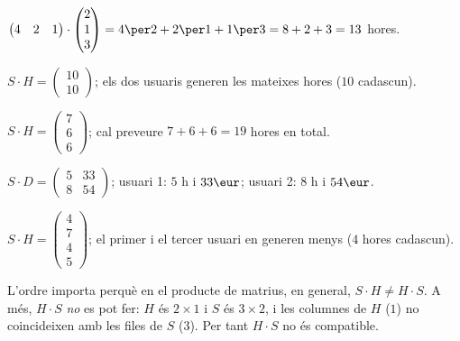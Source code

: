 \begin{solucions}
\begin{sollist}
  \item $\begin{pmatrix} 4 & 2 & 1 \end{pmatrix}\cdot\begin{pmatrix} 2 \\ 1 \\ 3 \end{pmatrix}
        =4\per 2+2\per 1+1\per 3=8+2+3=13$ hores.
  \item $S\cdot H=\begin{pmatrix} 10 \\ 10 \end{pmatrix}$;
        \;els dos usuaris generen les mateixes hores ($10$ cadascun).
  \item $S\cdot H=\begin{pmatrix} 7 \\ 6 \\ 6 \end{pmatrix}$;
        \;cal preveure $7+6+6=19$ hores en total.
  \item $S\cdot D=\begin{pmatrix} 5 & 33 \\ 8 & 54 \end{pmatrix}$;
        \;usuari 1: $5$ h i $33\eur$; usuari 2: $8$ h i $54\eur$.
  \item $S\cdot H=\begin{pmatrix} 4 \\ 7 \\ 4 \\ 5 \end{pmatrix}$;
        \;el primer i el tercer usuari en generen menys ($4$ hores cadascun).
  \item L'ordre importa perquè en el producte de matrius, en general,
        $S\cdot H\neq H\cdot S$. A més, $H\cdot S$ \emph{no} es pot fer: $H$ és
        $2\times 1$ i $S$ és $3\times 2$, i les columnes de $H$ ($1$) no coincideixen
        amb les files de $S$ ($3$). Per tant $H\cdot S$ no és compatible.
\end{sollist}
\end{solucions}

